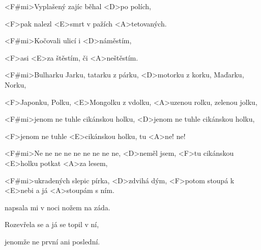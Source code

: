 

\zs
<F#mi>Vyplašený zajíc běhal
<D>po polích,

<F>pak nalezl <E>smrt v pažích
<A>tetovaných.

<F#mi>Kočovali ulicí i
<D>náměstím,

<F>asi <E>za štěstím,
či <A>neštěstím.
\ks

\zr
<F#mi>Bulharku Jarku, tatarku z párku,
<D>motorku z korku, Maďarku, Norku,

<F>Japonku, Polku, <E>Mongolku z vdolku,
<A>uzenou rolku, zelenou jolku,

<F#mi>jenom ne tuhle cikánskou holku,
<D>jenom ne tuhle cikánskou holku,

<F>jenom ne tuhle <E>cikánskou holku,
tu <A>ne! ne!

<F#mi>Ne ne ne ne ne ne ne ne ne, <D>neměl jsem,
<F>tu cikánskou <E>holku potkat <A>za lesem,

<F#mi>ukradených slepic pírka, <D>zdvihá dým,
<F>potom stoupá k <E>nebi a já <A>stoupám s ním.
\kr

\zs
{}

napsala mi v noci nožem
na záda.

Rozevřela se a já se
topil v ní,

jenomže ne první ani
poslední.
\ks

\zr \kr

\kp
